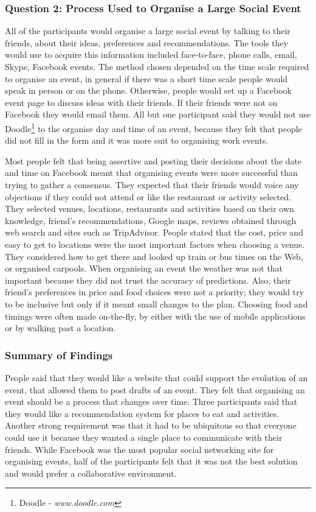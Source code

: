 \documentclass{sigchi}
\begin{document}
\subsubsection{Question 2: Process Used to Organise a Large Social Event}
All of the participants would organise a large social event by talking to their friends, about their ideas, preferences and recommendations.  The tools they would use to acquire this information included face-to-face, phone calls, email, Skype, Facebook events.  The method chosen depended on the time scale required to organise an event, in general if there was a short time scale people would speak in person or on the phone.  Otherwise, people would set up a Facebook event page to discuss ideas with their friends.  If their friends were not on Facebook they would email them.  All but one participant said they would not use Doodle\footnote{Doodle - \emph{www.doodle.com}} to the organise day and time of an event, because they felt that people did not fill in the form and it was more suit to organising work events.  

Most people felt that being assertive and posting their decisions about the date and time on Facebook meant that organising events were more successful than trying to gather a consensus.  They expected that their friends would voice any objections if they could not attend or like the restaurant or activity selected.   They selected venues, locations, restaurants and activities based on their own knowledge, friend's recommendations, Google maps, reviews obtained through web search and sites such as TripAdvisor.  People stated that the cost, price and easy to get to locations were the most important factors when choosing a venue.  They considered how to get there and looked up train or bus times on the Web, or organised carpools.  When organising an event the weather was not that important because they did not trust the accuracy of predictions.  Also, their friend's preferences in price and food choices were not a priority; they would try to be inclusive but only if it meant small changes to the plan.  Choosing food and timings were often made on-the-fly, by either with the use of mobile applications or by walking past a location.

\subsubsection{Summary of Findings}
People said that they would like a website that could support the evolution of an event, that allowed them to post drafts of an event.  They felt that organising an event should be a process that changes over time.  Three participants said that they would like a recommendation system for places to eat and activities.  Another strong requirement was that it had to be ubiquitous so that everyone could use it because they wanted a single place to communicate with their friends.  While Facebook was the most popular social networking site for organising events, half of the participants felt that it was not the best solution and would prefer a collaborative environment.
\end{document}
